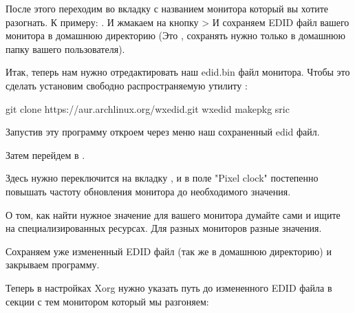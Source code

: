 \documentclass[letterpaper,10pt,russian,openany]{sphinxmanual}
\begin{document}
\sphinxAtStartPar
После этого переходим во вкладку с названием монитора который вы хотите разогнать.
К примеру: . И жмакаем на кнопку  \sphinxhyphen{}>
И сохраняем EDID файл вашего монитора в домашнюю директорию (Это , сохранять нужно только в домашнюю папку вашего пользователя).

\sphinxAtStartPar
Итак, теперь нам нужно отредактировать наш edid.bin файл монитора.
Чтобы это сделать установим свободно распространяемую утилиту :

\begin{sphinxVerbatim}[commandchars=\\\{\}]
git clone https://aur.archlinux.org/wxedid.git 
 wxedid                                      
makepkg \PYGZhy{}sric                                  
\end{sphinxVerbatim}

\sphinxAtStartPar
Запустив эту программу откроем через меню наш сохраненный edid файл.

\noindent{}

\sphinxAtStartPar
Затем перейдем в .

\noindent{}

\sphinxAtStartPar
Здесь нужно переключится на вкладку ,
и в поле "Pixel clock" постепенно повышать частоту обновления монитора до необходимого значения.

\noindent{}

\sphinxAtStartPar
О том, как найти нужное значение для вашего монитора \sphinxhyphen{} думайте сами и ищите на специализированных ресурсах.
Для разных мониторов \sphinxhyphen{} разные значения.

\sphinxAtStartPar
Сохраняем уже измененный EDID файл (так же в домашнюю директорию) и закрываем программу.

\noindent{}

\sphinxAtStartPar
Теперь в настройках Xorg нужно указать путь до измененного EDID файла в секции с тем монитором который мы разгоняем:
\end{document}
